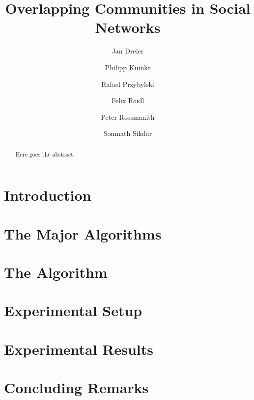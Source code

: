 \documentclass[12pt]{article}
\title{Overlapping Communities in Social Networks}
\author{Jan Dreier 
\and Philipp Kuinke 
\and Rafael Przybylski 
\and Felix Reidl 
\and Peter Rossmanith 
\and Somnath Sikdar}
\date{}
\begin{document}
\maketitle

\begin{abstract}
Here goes the abstract.
\end{abstract}

\section{Introduction}


\section{The Major Algorithms} \label{sec:major_algorithms}


\section{The Algorithm} \label{sec:algorithm}


\section{Experimental Setup} \label{sec:experiment_setup}



\section{Experimental Results}\label{sec:experiment_results}




%

\section{Concluding Remarks} \label{sec:conclusions}

\def\redefineme{
    \def\LNCS{LNCS}%
    \def\ICALP##1{Proc. of ##1 ICALP}%
    \def\FOCS##1{Proc. of ##1 FOCS}%
    \def\COCOON##1{Proc. of ##1 COCOON}%
    \def\SODA##1{Proc. of ##1 SODA}%
    \def\SWAT##1{Proc. of ##1 SWAT}%
    \def\IWPEC##1{Proc. of ##1 IWPEC}%
    \def\IWOCA##1{Proc. of ##1 IWOCA}%
    \def\ISAAC##1{Proc. of ##1 ISAAC}%
    \def\STACS##1{Proc. of ##1 STACS}%
    \def\ESA##1{Proc. of ##1 ESA}%
    \def\WG##1{Proc. of ##1 WG}%
    \def\LIPIcs##1{LIPIcs}%
    \def\LIPIcs{LIPIcs}%
    \def\LICS##1{Proc. of ##1 LICS}%
}

%


\end{document}
